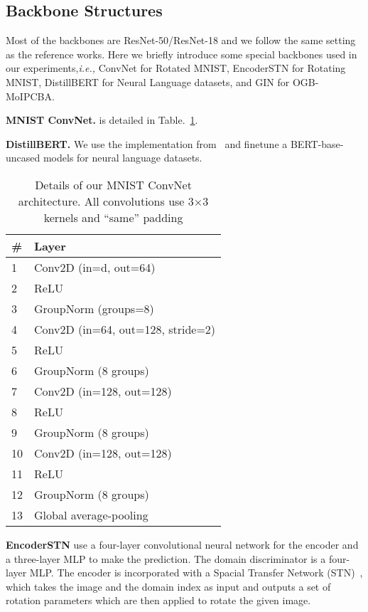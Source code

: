 \documentclass{article} \usepackage{iclr2023_conference,times}
\newcommand{\ie}[0]{\textit{i.e., }}
\begin{document}
\subsection{Backbone Structures}

Most of the backbones are ResNet-50/ResNet-18 and we follow the same setting as the reference works. Here we briefly introduce some special backbones used in our experiments,\ie ConvNet for Rotated MNIST, EncoderSTN for Rotating MNIST, DistillBERT for Neural Language datasets, and GIN for OGB-MoIPCBA.

\noindent\textbf{MNIST ConvNet.} is detailed in Table.~\ref{tab:convnet}. 

\noindent\textbf{DistillBERT.} We use the implementation from~\citep{wolf2019huggingface} and finetune a BERT-base-uncased models for neural language datasets. 
\begin{table}
\centering
\caption{Details of our MNIST ConvNet architecture. All convolutions use 3×3 kernels and ``same'' padding}\label{tab:convnet}
\begin{tabular}{@{}ll@{}}
\toprule
\# & Layer                                                     \\ \midrule
1  & \cellcolor[HTML]{FFFFFF}Conv2D (in=d, out=64)             \\
2  & \cellcolor[HTML]{FFFFFF}ReLU                              \\
3  & \cellcolor[HTML]{FFFFFF}GroupNorm (groups=8)              \\
4  & \cellcolor[HTML]{FFFFFF}Conv2D (in=64, out=128, stride=2) \\
5  & \cellcolor[HTML]{FFFFFF}ReLU                              \\
6  & \cellcolor[HTML]{FFFFFF}GroupNorm (8 groups)              \\
7  & \cellcolor[HTML]{FFFFFF}Conv2D (in=128, out=128)          \\
8  & \cellcolor[HTML]{FFFFFF}ReLU                              \\
9  & \cellcolor[HTML]{FFFFFF}GroupNorm (8 groups)              \\
10 & \cellcolor[HTML]{FFFFFF}Conv2D (in=128, out=128)          \\
11 & \cellcolor[HTML]{FFFFFF}ReLU                              \\
12 & \cellcolor[HTML]{FFFFFF}GroupNorm (8 groups)              \\
13 & \cellcolor[HTML]{FFFFFF}Global average-pooling            \\ \bottomrule
\end{tabular}
\end{table}
\noindent\textbf{EncoderSTN} use a four-layer convolutional neural network for the encoder and a three-layer MLP to make the prediction. The domain discriminator is a four-layer MLP. The encoder is incorporated with a Spacial Transfer Network (STN)~\citep{jaderberg2015spatial}, which takes the image and the domain index as input and outputs a set of rotation parameters which are then applied to rotate the given image.
\end{document}
